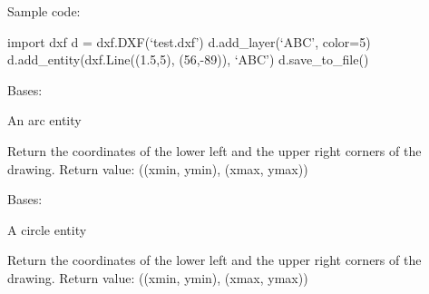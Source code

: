 \documentclass[letterpaper,10pt,english]{sphinxmanual}
\begin{document}
Sample code:

import dxf
d = dxf.DXF(`test.dxf')
d.add\_layer(`ABC', color=5)
d.add\_entity(dxf.Line((1.5,5), (56,-89)), `ABC')
d.save\_to\_file()

\begin{fulllineitems}
\label{api/gtrace.draw:gtrace.draw.dxf.Arc}
Bases: {\hyperref[api/gtrace.draw:gtrace.draw.dxf.Entity]{}}

An arc entity

\begin{fulllineitems}
\label{api/gtrace.draw:gtrace.draw.dxf.Arc.draw}
\end{fulllineitems}


\begin{fulllineitems}
\label{api/gtrace.draw:gtrace.draw.dxf.Arc.report_min_max}
Return the coordinates of the lower left and the upper right corners
of the drawing.
Return value: ((xmin, ymin), (xmax, ymax))

\end{fulllineitems}


\end{fulllineitems}


\begin{fulllineitems}
\label{api/gtrace.draw:gtrace.draw.dxf.Circle}
Bases: {\hyperref[api/gtrace.draw:gtrace.draw.dxf.Entity]{}}

A circle entity

\begin{fulllineitems}
\label{api/gtrace.draw:gtrace.draw.dxf.Circle.draw}
\end{fulllineitems}


\begin{fulllineitems}
\label{api/gtrace.draw:gtrace.draw.dxf.Circle.report_min_max}
Return the coordinates of the lower left and the upper right corners
of the drawing.
Return value: ((xmin, ymin), (xmax, ymax))

\end{fulllineitems}


\end{fulllineitems}
\end{document}

